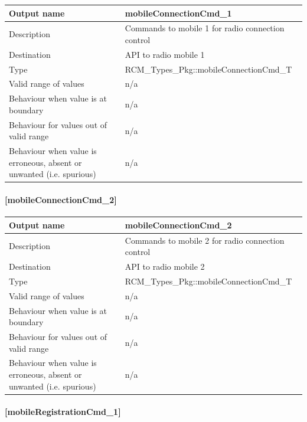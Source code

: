 \begin{longtable}{p{}p{}}
	\toprule
	Output name				& mobileConnectionCmd\_1 \\
	\midrule
	Description				& Commands to mobile 1 for radio connection control  \\
	\midrule
	Destination				& API to radio mobile 1 \\ 
	\midrule
	Type					& RCM\_Types\_Pkg::mobileConnectionCmd\_T \\
	\midrule
	Valid range of values	& n/a \\
	\midrule
	Behaviour when value is at boundary	& n/a \\
	\midrule
	Behaviour for values out of valid range	& n/a \\
	\midrule
	Behaviour when value is erroneous, absent or unwanted (i.e. spurious) & n/a \\
	\bottomrule
\end{longtable}

\paragraph{[mobileConnectionCmd\_2]}

\begin{longtable}{p{}p{}}
	\toprule
	Output name				& mobileConnectionCmd\_2 \\
	\midrule
	Description				& Commands to mobile 2 for radio connection control  \\
	\midrule
	Destination				& API to radio mobile 2 \\ 
	\midrule
	Type					& RCM\_Types\_Pkg::mobileConnectionCmd\_T \\
	\midrule
	Valid range of values	& n/a \\
	\midrule
	Behaviour when value is at boundary	& n/a \\
	\midrule
	Behaviour for values out of valid range	& n/a \\
	\midrule
	Behaviour when value is erroneous, absent or unwanted (i.e. spurious) & n/a \\
	\bottomrule
\end{longtable}

\paragraph{[mobileRegistrationCmd\_1]}

